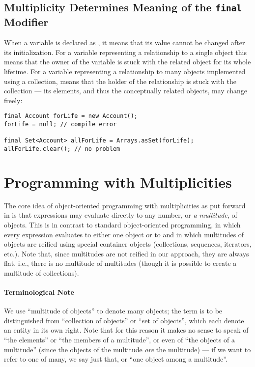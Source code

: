 {\subsection{Multiplicity Determines Meaning of the \texttt{final} Modifier}
\label{section2.7}

\noindent When a variable is declared as , it means that its
value cannot be changed after its initialization. For a variable
representing a relationship to a single object this means that the owner of
the variable is stuck with the related object for its whole lifetime. For a
variable representing a relationship to many objects implemented using a
collection,  means that the holder of the relationship is stuck
with the collection --- its elements, and thus the conceptually related
objects, may change freely:

\begin{lstlisting}
final Account forLife = new Account();
forLife = null; // compile error

final Set<Account> allForLife = Arrays.asSet(forLife);
allForLife.clear(); // no problem
\end{lstlisting}

\section{Programming with Multiplicities}
\label{section3}

\noindent The core idea of object-oriented programming with multiplicities
as put forward in \cite{ref37} is that expressions may evaluate directly to any
number, or \emph{a multitude}, of objects. This is in
contrast to standard object-oriented programming, in which every expression
evaluates to either one object or to  and in which multitudes of
objects are reified using special container objects (collections, sequences,
iterators, etc.). Note that, since multitudes are not reified in our
approach, they are always flat, i.e., there is no multitude of multitudes
(though it is possible to create a multitude of collections).

\paragraph{Terminological Note} We use ``multitude of objects'' to denote many objects;
the term is to be distinguished from ``collection of objects'' or
``set of objects'', which each denote an entity in its own right. Note that for
this reason it makes no sense to speak of ``the elements'' or ``the
members of a multitude'', or even of ``the objects of a multitude'' (since
the objects of the multitude \emph{are} the multitude) --- if we want
to refer to one of many, we say just that, or ``one object among
a multitude''.

}
